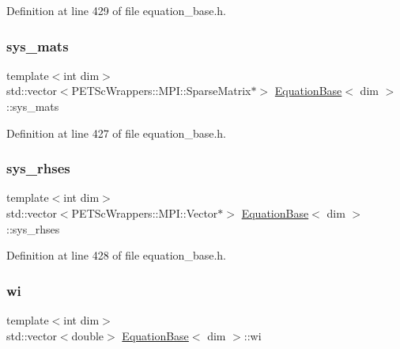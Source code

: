 Definition at line 429 of file equation\+\_\+base.\+h.

\mbox{\label{class_equation_base_afcdb76718da046b950c466500de44a03}} 
\subsubsection{\texorpdfstring{sys\+\_\+mats}{sys\_mats}}
{\footnotesize\ttfamily template$<$int dim$>$ \\
std\+::vector$<$P\+E\+T\+Sc\+Wrappers\+::\+M\+P\+I\+::\+Sparse\+Matrix$\ast$$>$ \hyperlink{class_equation_base}{Equation\+Base}$<$ dim $>$\+::sys\+\_\+mats\hspace{0.3cm}{\ttfamily [private]}}



Definition at line 427 of file equation\+\_\+base.\+h.

\mbox{\label{class_equation_base_a89fe13a13fa7f46cc20bdab8a884216c}} 
\subsubsection{\texorpdfstring{sys\+\_\+rhses}{sys\_rhses}}
{\footnotesize\ttfamily template$<$int dim$>$ \\
std\+::vector$<$P\+E\+T\+Sc\+Wrappers\+::\+M\+P\+I\+::\+Vector$\ast$$>$ \hyperlink{class_equation_base}{Equation\+Base}$<$ dim $>$\+::sys\+\_\+rhses\hspace{0.3cm}{\ttfamily [private]}}



Definition at line 428 of file equation\+\_\+base.\+h.

\mbox{\label{class_equation_base_a46388ad4bea156033fa98fd8f484a068}} 
\subsubsection{\texorpdfstring{wi}{wi}}
{\footnotesize\ttfamily template$<$int dim$>$ \\
std\+::vector$<$double$>$ \hyperlink{class_equation_base}{Equation\+Base}$<$ dim $>$\+::wi\hspace{0.3cm}{\ttfamily [protected]}}



